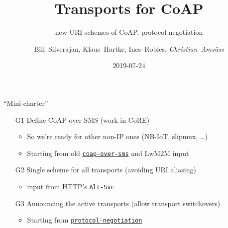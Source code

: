 \documentclass[aspectratio=169]{beamer}
\title{Transports for CoAP}
\subtitle{new URI schemes of CoAP. protocol negotiation}
\author{Bill~Silverajan, Klaus~Hartke, Ines~Robles, \em Christian~Amsüss}
\date{2019-07-24}
\begin{document}
\frame{\titlepage}

\begin{frame}{``Mini-charter''}\begin{center}
	\Large
	\begin{itemize}
		\item[G1] Define CoAP over SMS (work in CoRE)
			\begin{itemize} \Large
				\item<2-> So we're ready for other non-IP ones (NB-IoT, slipmux, \ldots)
				\item<2-> Starting from old \href{https://tools.ietf.org/html/draft-becker-core-coap-sms-gprs-06}{\texttt{coap-over-sms}} and LwM2M input
			\end{itemize}
		\item[G2] Single scheme for all transports (avoiding URI aliasing)
			\begin{itemize} \Large
				\item<3-> input from HTTP's \href{https://tools.ietf.org/html/rfc7838}{\texttt{Alt-Svc}}
			\end{itemize}
		\item[G3] Announcing the active transports (allow transport switchovers)
			\begin{itemize} \Large
				\item<4-> Starting from \href{https://tools.ietf.org/html/draft-silverajan-core-coap-protocol-negotiation-09}{\texttt{protocol-negotiation}}
			\end{itemize}
	\end{itemize}
\end{center}\end{frame}
\end{document}
